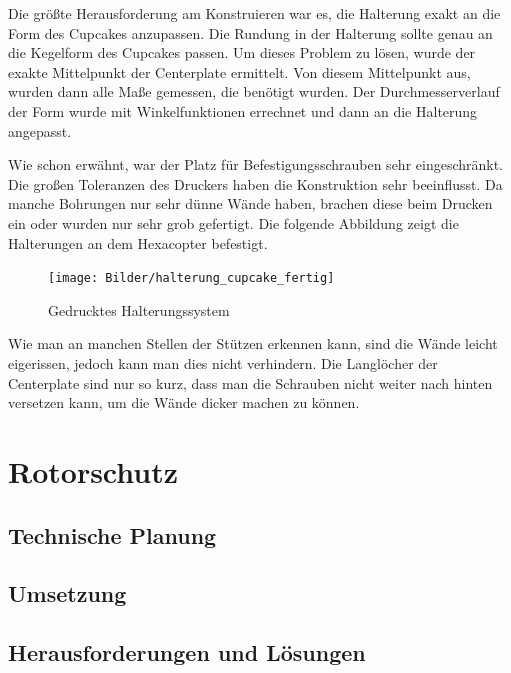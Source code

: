 	Die größte Herausforderung am Konstruieren war es, die Halterung exakt an die Form des Cupcakes anzupassen. Die Rundung in der Halterung sollte genau an die Kegelform des Cupcakes passen.
	Um dieses Problem zu lösen, wurde der exakte Mittelpunkt der Centerplate ermittelt. Von diesem Mittelpunkt aus, wurden dann alle Maße gemessen, die benötigt wurden.
	Der Durchmesserverlauf der Form wurde mit Winkelfunktionen errechnet und dann an die Halterung angepasst.

	Wie schon erwähnt, war der Platz für Befestigungsschrauben sehr eingeschränkt. Die großen Toleranzen des Druckers haben die Konstruktion sehr beeinflusst.
	Da manche Bohrungen nur sehr dünne Wände haben, brachen diese beim Drucken ein oder wurden nur sehr grob gefertigt. Die folgende Abbildung zeigt die Halterungen an dem Hexacopter befestigt.

		\begin{figure}[tbh]
		\begin{centering}
		\texttt{[image: Bilder/halterung\_cupcake\_fertig]}
		\par\end{centering}
		\caption{Gedrucktes Halterungssystem}
		\label{halterung_cupcake_fertig}
		\end{figure}

		Wie man an manchen Stellen der Stützen erkennen kann, sind die Wände leicht eigerissen, jedoch kann man dies nicht verhindern.
		Die Langlöcher der Centerplate sind nur so kurz, dass man die Schrauben nicht weiter nach hinten versetzen kann, um die Wände dicker machen zu können.


\section{Rotorschutz}

	\subsection{Technische Planung}

	\subsection{Umsetzung}

	\subsection{Herausforderungen und Lösungen}

